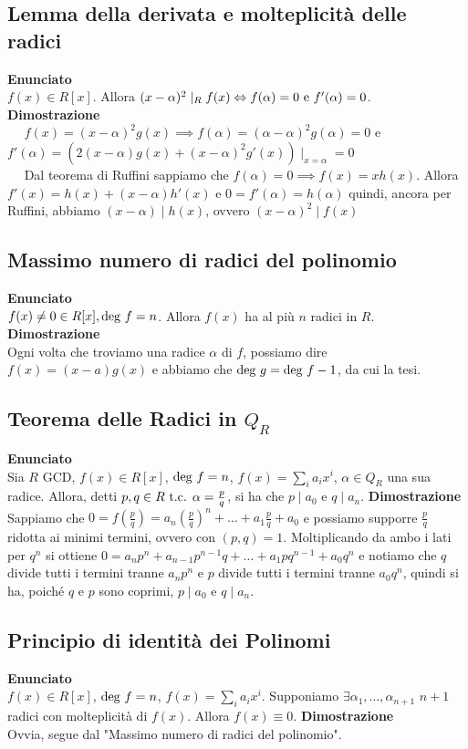 \documentclass[a4paper,NoNotes,GeneralMath]{stdmdoc}
\newcommand{\Enunciato}{\vskip 0.05cm \noindent \textbf{Enunciato} \\ }
\renewcommand{\Dimostrazione}{\vskip 0.05cm \noindent \textbf{Dimostrazione} \\ }
\newcommand{\frdx}{ \framebox[\width]{ $\Rightarrow$ } }
\newcommand{\frsx}{ \framebox[\width]{ $\Leftarrow$ } }
\begin{document}
	\subsection{Lemma della derivata e molteplicità delle radici}
	\Enunciato $f(x) \in R[x]$. Allora $(x-\alpha)^2 \mid_R f(x) \Leftrightarrow f(\alpha) = 0 \text{ e } f'(\alpha) = 0$.
	\Dimostrazione \frdx $\quad$ $f(x) = (x-\alpha)^2g(x) \implies f(\alpha) = (\alpha-\alpha)^2g(\alpha) = 0$ e $f'(\alpha) = (2(x-\alpha)g(x) + (x-\alpha)^2 g'(x))\mid_{x = \alpha} = 0$ \\
		\frsx $\quad$ Dal teorema di Ruffini sappiamo che $f(\alpha) = 0 \implies f(x) = xh(x)$. Allora $f'(x) = h(x) + (x-\alpha) h'(x)$ e $0 = f'(\alpha) = h(\alpha)$ quindi, ancora per Ruffini, abbiamo $(x-\alpha) \mid h(x)$, ovvero $(x-\alpha)^2 \mid f(x)$

	\subsection{Massimo numero di radici del polinomio}
	\Enunciato $f(x) \neq 0 \in R[x], \mbox{deg } f = n$. Allora $f(x)$ ha al più $n$ radici in $R$.
	\Dimostrazione Ogni volta che troviamo una radice $\alpha$ di $f$, possiamo dire $f(x) = (x-a)g(x)$ e abbiamo che $\mbox{deg } g = \mbox{deg } f - 1$, da cui la tesi.

	\subsection{Teorema delle Radici in $Q_R$}
	\Enunciato Sia $R$ GCD, $f(x) \in R[x]$, $\mbox{deg } f = n$, $f(x) = \sum_i a_i x^i$, $\alpha \in Q_R$ una sua radice. Allora, detti $p, q \in R \mbox{ t.c. } \alpha = \frac{p}{q}$, si ha che $p \mid a_0$ e $q \mid a_n$.
	\Dimostrazione Sappiamo che $0 = f(\frac{p}{q}) = a_n (\frac{p}{q})^n + \ldots + a_1 \frac{p}{q} + a_0$ e possiamo supporre $\frac{p}{q}$ ridotta ai minimi termini, ovvero con $(p,q) = 1$. Moltiplicando da ambo i lati per $q^n$ si ottiene $0 = a_n p^n + a_{n-1} p^{n-1}q + \ldots + a_1 pq^{n-1} + a_0 q^n$ e notiamo che $q$ divide tutti i termini tranne $a_n p^n$ e $p$ divide tutti i termini tranne $a_0 q^n$, quindi si ha, poiché $q$ e $p$ sono coprimi, $p \mid a_0$ e $q \mid a_n$.

	\subsection{Principio di identità dei Polinomi}
	\Enunciato $f(x) \in R[x]$, $\mbox{deg } f = n$, $f(x) = \sum_i a_i x^i$. Supponiamo $\exists \alpha_1, \ldots, \alpha_{n+1}$ $n+1$ radici con molteplicità di $f(x)$. Allora $f(x) \equiv 0$.
	\Dimostrazione Ovvia, segue dal "Massimo numero di radici del polinomio".
\end{document}
